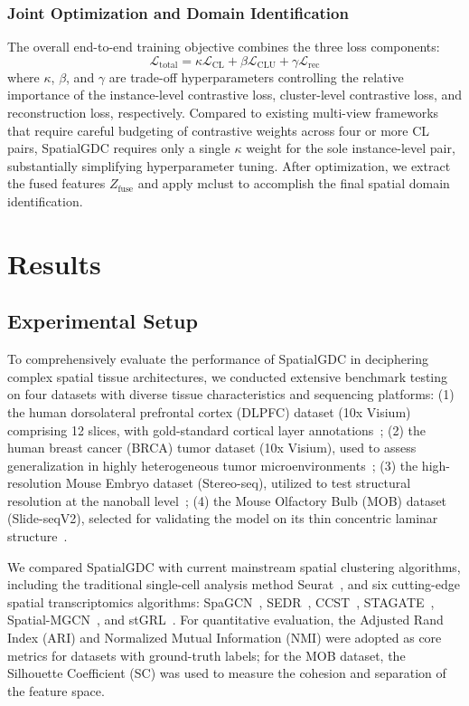 \documentclass[lettersize,journal]{IEEEtran}
\begin{document}
\subsubsection{Joint Optimization and Domain Identification}
The overall end-to-end training objective combines the three loss components:
\begin{equation}
    \mathcal{L}_{\text{total}} = \kappa \mathcal{L}_{\text{CL}} + \beta \mathcal{L}_{\text{CLU}} + \gamma \mathcal{L}_{\text{rec}}
\end{equation}
where $\kappa$, $\beta$, and $\gamma$ are trade-off hyperparameters controlling the relative importance of the instance-level contrastive loss, cluster-level contrastive loss, and reconstruction loss, respectively. Compared to existing multi-view frameworks that require careful budgeting of contrastive weights across four or more CL pairs, SpatialGDC requires only a single $\kappa$ weight for the sole instance-level pair, substantially simplifying hyperparameter tuning. After optimization, we extract the fused features $Z_{\text{fuse}}$ and apply mclust to accomplish the final spatial domain identification.

\section{Results}
\label{sec:results}


\subsection{Experimental Setup}
To comprehensively evaluate the performance of SpatialGDC in deciphering complex spatial tissue architectures, we conducted extensive benchmark testing on four datasets with diverse tissue characteristics and sequencing platforms: (1) the human dorsolateral prefrontal cortex (DLPFC) dataset (10x Visium) comprising 12 slices, with gold-standard cortical layer annotations~\cite{maynard2021dlpfc}; (2) the human breast cancer (BRCA) tumor dataset (10x Visium), used to assess generalization in highly heterogeneous tumor microenvironments~\cite{fu2021sedr}; (3) the high-resolution Mouse Embryo dataset (Stereo-seq), utilized to test structural resolution at the nanoball level~\cite{chen2022stereoseq}; (4) the Mouse Olfactory Bulb (MOB) dataset (Slide-seqV2), selected for validating the model on its thin concentric laminar structure~\cite{stickels2021slideseq}.

We compared SpatialGDC with current mainstream spatial clustering algorithms, including the traditional single-cell analysis method Seurat~\cite{stuart2019comprehensive}, and six cutting-edge spatial transcriptomics algorithms: SpaGCN~\cite{hu2021spagcn}, SEDR~\cite{fu2021sedr}, CCST~\cite{li2022cell}, STAGATE~\cite{dong2022stagate}, Spatial-MGCN~\cite{wang2023spatialmgcn}, and stGRL~\cite{lu2025stgrl}. For quantitative evaluation, the Adjusted Rand Index (ARI) and Normalized Mutual Information (NMI) were adopted as core metrics for datasets with ground-truth labels; for the MOB dataset, the Silhouette Coefficient (SC) was used to measure the cohesion and separation of the feature space.
\end{document}
